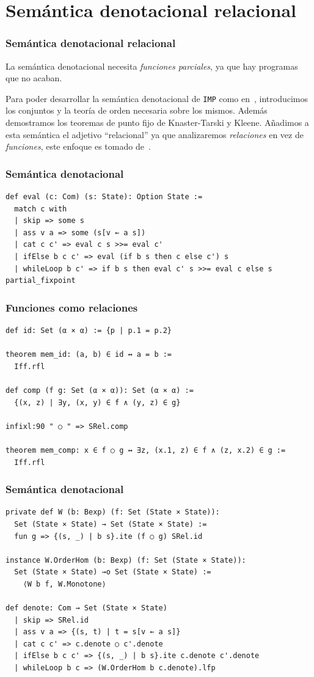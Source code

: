 \documentclass[9pt]{beamer}
\newcommand{\ImpName}{\texttt{IMP}}
\begin{document}
\section{Semántica denotacional relacional}

\begin{frame}
\frametitle{Semántica denotacional relacional}

La semántica denotacional necesita \emph{funciones parciales}, ya que hay programas que no acaban.

Para poder desarrollar la semántica denotacional de \ImpName{} como en~\cite{winskel_formal_semantics},
introducimos los conjuntos y la teoría de orden necesaria sobre los mismos. Además demostramos
los teoremas de punto fijo de Knaster-Tarski y Kleene. 
Añadimos a esta semántica el
adjetivo \enquote{relacional} ya que analizaremos \emph{relaciones} en vez de \emph{funciones},
este enfoque es tomado de~\cite{semantics_with_isabelle}.
\end{frame}

\begin{frame}[fragile]
\frametitle{Semántica denotacional}
\begin{verbatim}
def eval (c: Com) (s: State): Option State :=
  match c with
  | skip => some s
  | ass v a => some (s[v ← a s])
  | cat c c' => eval c s >>= eval c'
  | ifElse b c c' => eval (if b s then c else c') s
  | whileLoop b c' => if b s then eval c' s >>= eval c else s
partial_fixpoint
\end{verbatim}
\end{frame}


\begin{frame}[fragile]
\frametitle{Funciones como relaciones}
\begin{verbatim}
def id: Set (α × α) := {p | p.1 = p.2}

theorem mem_id: (a, b) ∈ id ↔ a = b :=
  Iff.rfl

def comp (f g: Set (α × α)): Set (α × α) :=
  {(x, z) | ∃y, (x, y) ∈ f ∧ (y, z) ∈ g}

infixl:90 " ○ " => SRel.comp

theorem mem_comp: x ∈ f ○ g ↔ ∃z, (x.1, z) ∈ f ∧ (z, x.2) ∈ g :=
  Iff.rfl
\end{verbatim}
\end{frame}

\begin{frame}[fragile]
\frametitle{Semántica denotacional}
\begin{verbatim}
private def W (b: Bexp) (f: Set (State × State)):
  Set (State × State) → Set (State × State) :=
  fun g => {(s, _) | b s}.ite (f ○ g) SRel.id
  
instance W.OrderHom (b: Bexp) (f: Set (State × State)):
  Set (State × State) →o Set (State × State) :=
    ⟨W b f, W.Monotone⟩

def denote: Com → Set (State × State)
  | skip => SRel.id
  | ass v a => {(s, t) | t = s[v ← a s]}
  | cat c c' => c.denote ○ c'.denote
  | ifElse b c c' => {(s, _) | b s}.ite c.denote c'.denote
  | whileLoop b c => (W.OrderHom b c.denote).lfp
\end{verbatim}
\end{frame}
\end{document}
